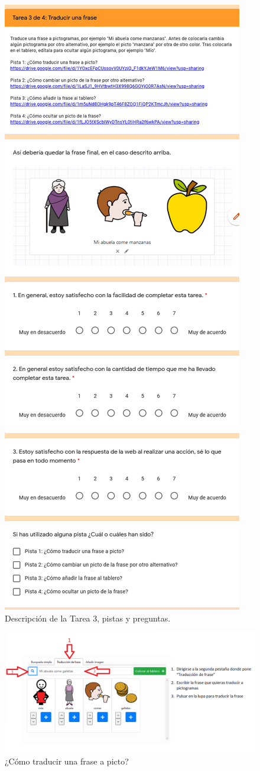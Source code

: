 \begin{figure}[h!]
	\centering
	\includegraphics[width=0.6\linewidth]{Imagenes/Bitmap/Tarea3Preguntas}
	\caption{Descripción de la Tarea 3, pistas y preguntas.}
	\label{fig:tarea3preguntas}
\end{figure}

\begin{figure}[h!]
	\centering
	\includegraphics[width=\linewidth]{Imagenes/Bitmap/Tarea3-Pista1}
	\caption{¿Cómo traducir una frase a picto?}
	\label{fig:tarea3-pista1}
\end{figure}


